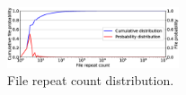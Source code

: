\begin{figure} \centering
	\includegraphics[width=0.45\textwidth]{graphs/File_repeat_count.eps}
	\caption{File repeat count distribution.
	} \label{fig:file-repeat-cnt}
\end{figure}

